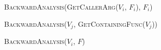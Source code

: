 \begin{algorithm}[tb]
{{    
    {
      {
         
         
         {
            {\textsc{BackwardAnalysis}(\textsc{GetCallerArg}($V_i$, $F_i$), $F_i$)}
         }
         
      }
      {
        
         {
            {\textsc{BackwardAnalysis}($V_j$, \textsc{GetContainingFunc}($V_j$))}
         }
         
      }
      \uElse
      {
        {\textsc{BackwardAnalysis}($V_i$, $F$)}
      }
    }
  }
}
\end{algorithm}
